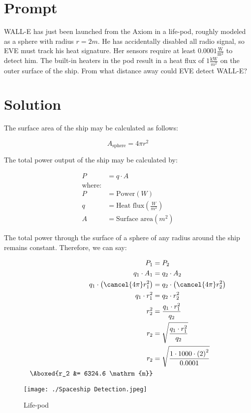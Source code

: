 \hypertarget{prompt}{%
\section{Prompt}\label{prompt}}

WALL-E has just been launched from the Axiom in a life-pod, roughly
modeled as a sphere with radius \(r=2m\). He has accidentally disabled
all radio signal, so EVE must track his heat signature. Her sensors
require at least \(0.0001 \frac{\mathrm{W}}{\mathrm{m}^2}\) to detect
him. The built-in heaters in the pod result in a heat flux of
\(1 \frac{\mathrm{kW}}{{m}^2}\) on the outer surface of the ship. From
what distance away could EVE detect WALL-E?

\hypertarget{solution}{%
\section{Solution}\label{solution}}

The surface area of the ship may be calculated as follows:

\[
A_\mathrm{sphere} = 4 \pi r^2
\]

The total power output of the ship may be calculated by:

\[
\begin{aligned}
    P &= q \cdot A\\
    \text{where:}\\
    P &= \text{Power} \left( W \right)\\
    q &= \text{Heat flux}\left( \frac{W}{m^2} \right)\\
    A &= \text{Surface area} \left( m^2 \right)
\end{aligned}
\]

The total power through the surface of a sphere of any radius around the
ship remains constant. Therefore, we can say:

\[
\begin{aligned}
P_1 &= P_2\\
q_1 \cdot A_1 &= q_2 \cdot A_2\\
q_1 \cdot \left( \cancel{4 \pi} r_1^2 \right) &= q_2 \cdot \left( \cancel{4 \pi} r_2^2 \right)\\
q_1 \cdot r_1^2 &= q_2 \cdot r_2^2\\
r_2^2 &= \frac{q_1\cdot r_1^2}{q_2}\\
r_2 &= \sqrt{\frac{q_1\cdot r_1^2}{q_2}}\\
r_2 &= \sqrt{\frac{1 \cdot 1000 \cdot \left( 2 \right)^2}{0.0001}}\\
\Aboxed{r_2 &= 6324.6 \mathrm{m}}
\end{aligned}
\]

\begin{figure}
\centering
\texttt{[image: ./Spaceship Detection.jpeg]}
\caption{Life-pod}
\end{figure}
